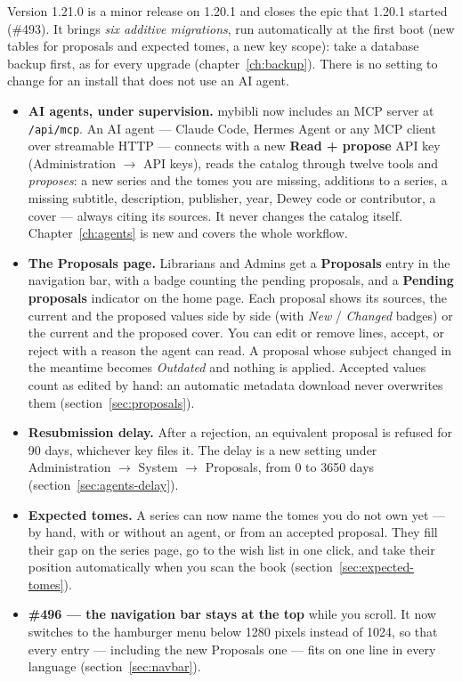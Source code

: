 Version 1.21.0 is a minor release on 1.20.1 and closes the epic that
1.20.1 started (\#493). It brings \emph{six additive migrations}, run
automatically at the first boot (new tables for proposals and expected
tomes, a new key scope): take a database backup first, as for every
upgrade (chapter~\ref{ch:backup}). There is no setting to change for
an install that does not use an AI agent.

\begin{itemize}
  \item \textbf{AI agents, under supervision.} mybibli now includes an
        MCP server at \texttt{/api/mcp}. An AI agent --- Claude Code,
        Hermes Agent or any MCP client over streamable HTTP ---
        connects with a new \textbf{Read + propose} API key
        (Administration \(\rightarrow\) API keys), reads the catalog
        through twelve tools and \emph{proposes}: a new series and the
        tomes you are missing, additions to a series, a missing
        subtitle, description, publisher, year, Dewey code or
        contributor, a cover --- always citing its sources. It never
        changes the catalog itself. Chapter~\ref{ch:agents} is new and
        covers the whole workflow.
  \item \textbf{The Proposals page.} Librarians and Admins get a
        \textbf{Proposals} entry in the navigation bar, with a badge
        counting the pending proposals, and a \textbf{Pending
        proposals} indicator on the home page. Each proposal shows its
        sources, the current and the proposed values side by side
        (with \emph{New} / \emph{Changed} badges) or the current and
        the proposed cover. You can edit or remove lines, accept, or
        reject with a reason the agent can read. A proposal whose
        subject changed in the meantime becomes \emph{Outdated} and
        nothing is applied. Accepted values count as edited by hand:
        an automatic metadata download never overwrites them
        (section~\ref{sec:proposals}).
  \item \textbf{Resubmission delay.} After a rejection, an equivalent
        proposal is refused for 90 days, whichever key files it. The
        delay is a new setting under Administration \(\rightarrow\)
        System \(\rightarrow\) Proposals, from 0 to 3650 days
        (section~\ref{sec:agents-delay}).
  \item \textbf{Expected tomes.} A series can now name the tomes you
        do not own yet --- by hand, with or without an agent, or from
        an accepted proposal. They fill their gap on the series page,
        go to the wish list in one click, and take their position
        automatically when you scan the book
        (section~\ref{sec:expected-tomes}).
  \item \textbf{\#496 \string— the navigation bar stays at the top}
        while you scroll. It now switches to the hamburger menu below
        1280 pixels instead of 1024, so that every entry --- including
        the new Proposals one --- fits on one line in every language
        (section~\ref{sec:navbar}).
\end{itemize}

